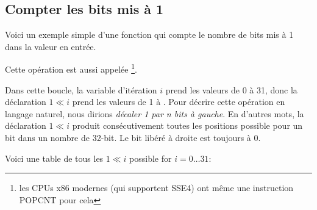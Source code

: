 ﻿\subsection{Compter les bits mis à 1}

Voici un exemple simple d'une fonction qui compte le nombre de bits mis à 1 dans
la valeur en entrée.

Cette opération est aussi appelée \footnote{les CPUs x86 modernes
(qui supportent SSE4) ont même une instruction POPCNT pour cela}.



Dans cette boucle, la variable d'itération $i$ prend les valeurs de 0 à 31, donc
la déclaration $1 \ll i$ prend les valeurs de 1 à .
Pour décrire cette opération en langage naturel, nous dirions \emph{décaler 1 par n bits à gauche}.
En d'autres mots, la déclaration $1 \ll i$ produit consécutivement toutes les positions
possible pour un bit dans un nombre de 32-bit.
Le bit libéré à droite est toujours à 0.

\label{2n_numbers_table}
Voici une table de tous les $1 \ll i$ possible
for $i=0 \ldots 31$:

